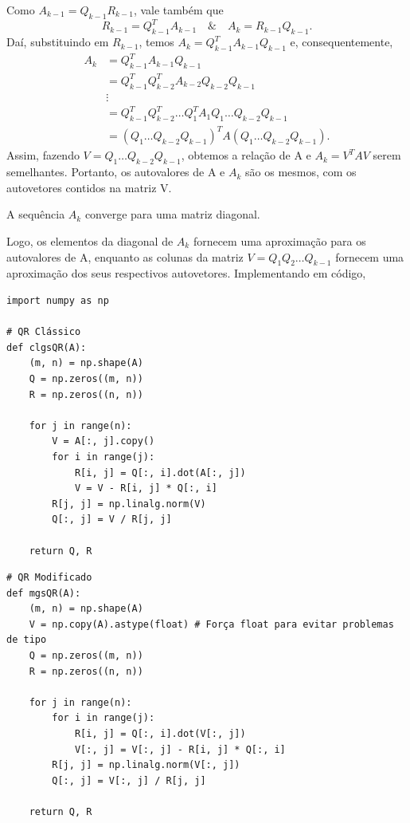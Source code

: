 \documentclass[../numerical_methods.tex]{subfiles}
\begin{document}
\begin{proof*}
	Como \(A_{k-1}=Q_{k-1}R_{k-1}\), vale também que
	\[
		R_{k-1} = Q_{k-1}^{T}A_{k-1} \quad\&\quad A_{k} = R_{k-1}Q_{k-1}.
	\]
	Daí, substituindo em \(R_{k-1}\), temos \(A_{k} = Q_{k-1}^{T}A_{k-1}Q_{k-1}\) e, consequentemente,
	\begin{align*}
		A_{k} & = Q_{k-1}^{T}A_{k-1}Q_{k-1}                                          \\
		      & = Q_{k-1}^{T}Q_{k-2}^{T}A_{k-2}Q_{k-2}Q_{k-1}                        \\
		      & \vdots                                                               \\
		      & = Q_{k-1}^{T}Q_{k-2}^{T}\dotsc Q_{1}^{T}A_1Q_1 \dotsc Q_{k-2}Q_{k-1} \\
		      & = (Q_1 \dotsc Q_{k-2}Q_{k-1})^{T}A (Q_1 \dotsc Q_{k-2}Q_{k-1}).
	\end{align*}
	Assim, fazendo \(V=Q_1 \dotsc Q_{k-2}Q_{k-1}\), obtemos a relação de A e \(A_{k} = V^{T}AV\) serem semelhantes. Portanto, os autovalores de A e \(A_{k}\) são os mesmos, com os autovetores contidos na matriz V. \qedsymbol
\end{proof*}
\begin{prop*}
	A sequência \(A_{k}\) converge para uma matriz diagonal.
\end{prop*}
Logo, os elementos da diagonal de \(A_{k}\) fornecem uma aproximação para os autovalores de A, enquanto as colunas da matriz \(V = Q_1Q_2 \dotsc Q_{k-1}\) fornecem uma aproximação dos seus respectivos autovetores.
Implementando em código,
\begin{listing}[H]
	\caption{Implementação do Método de Francis e Comparações}
	\begin{verbatim}
import numpy as np

# QR Clássico
def clgsQR(A):
    (m, n) = np.shape(A)
    Q = np.zeros((m, n))
    R = np.zeros((n, n))

    for j in range(n):
        V = A[:, j].copy()
        for i in range(j):
            R[i, j] = Q[:, i].dot(A[:, j])
            V = V - R[i, j] * Q[:, i]
        R[j, j] = np.linalg.norm(V)
        Q[:, j] = V / R[j, j]

    return Q, R
 \end{verbatim}
\end{listing}
\begin{listing}[H]
	\begin{verbatim}
# QR Modificado
def mgsQR(A):
    (m, n) = np.shape(A)
    V = np.copy(A).astype(float) # Força float para evitar problemas de tipo
    Q = np.zeros((m, n))
    R = np.zeros((n, n))

    for j in range(n):
        for i in range(j):
            R[i, j] = Q[:, i].dot(V[:, j])
            V[:, j] = V[:, j] - R[i, j] * Q[:, i]
        R[j, j] = np.linalg.norm(V[:, j])
        Q[:, j] = V[:, j] / R[j, j]

    return Q, R
 \end{verbatim}
\end{listing}
\end{document}
